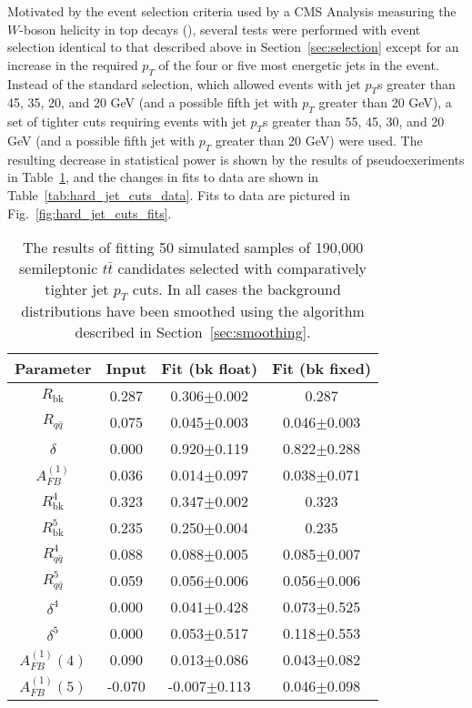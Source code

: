 \documentclass{cmspaperpdf}
\begin{document}
Motivated by the event selection criteria used by a CMS Analysis measuring the $W$-boson helicity in top decays (\cite{W_helicity_an}), several tests were performed with event selection identical to that described above in Section~\ref{sec:selection} except for an increase in the required $p_{T}$ of the four or five most energetic jets in the event. Instead of the standard selection, which allowed events with jet $p_{T}$s greater than 45, 35, 20, and 20 GeV (and a possible fifth jet with $p_{T}$ greater than 20 GeV), a set of tighter cuts requiring events with jet $p_{T}$s greater than 55, 45, 30, and 20 GeV (and a possible fifth jet with $p_{T}$ greater than 20 GeV) were used. The resulting decrease in statistical power is shown by the results of pseudoexeriments in Table~\ref{tab:hard_jet_cuts_pseudoexperiments}, and the changes in fits to data are shown in Table~\ref{tab:hard_jet_cuts_data}. Fits to data are pictured in Fig.~\ref{fig:hard_jet_cuts_fits}.

\begin{table}[hbt]
\begin{center}
\caption{\small \label{tab:hard_jet_cuts_pseudoexperiments} The results of fitting 50 simulated samples of 190,000 semileptonic $t\bar t$ candidates selected with comparatively tighter jet $p_{T}$ cuts. In all cases the background distributions have been smoothed using the algorithm described in Section~\ref{sec:smoothing}.}
\vspace{3pt}
\begin{tabular}{|c|c|cc|}\hline
Parameter         & Input  & Fit (bk float)   & Fit (bk fixed)    \\
\hline
$R_\mathrm{bk}$   & 0.287  & 0.306$\pm$0.002  & 0.287             \\
$R_{q\bar q}$     & 0.075  & 0.045$\pm$0.003  & 0.046$\pm$0.003   \\
$\delta$          & 0.000  & 0.920$\pm$0.119  & 0.822$\pm$0.288   \\
$A^{(1)}_{FB}$    & 0.036  & 0.014$\pm$0.097  & 0.038$\pm$0.071   \\
\hline
$R^4_\mathrm{bk}$ & 0.323  & 0.347$\pm$0.002  & 0.323             \\
$R^5_\mathrm{bk}$ & 0.235  & 0.250$\pm$0.004  & 0.235             \\
$R^4_{q\bar q}$   & 0.088  & 0.088$\pm$0.005  & 0.085$\pm$0.007   \\
$R^5_{q\bar q}$   & 0.059  & 0.056$\pm$0.006  & 0.056$\pm$0.006   \\
$\delta^4$        & 0.000  & 0.041$\pm$0.428  & 0.073$\pm$0.525   \\
$\delta^5$        & 0.000  & 0.053$\pm$0.517  & 0.118$\pm$0.553   \\
$A^{(1)}_{FB}(4)$ & 0.090  & 0.013$\pm$0.086  & 0.043$\pm$0.082   \\
$A^{(1)}_{FB}(5)$ & -0.070 & -0.007$\pm$0.113 & 0.046$\pm$0.098   \\
\hline
\end{tabular}
\end{center}
\end{table}
\end{document}
